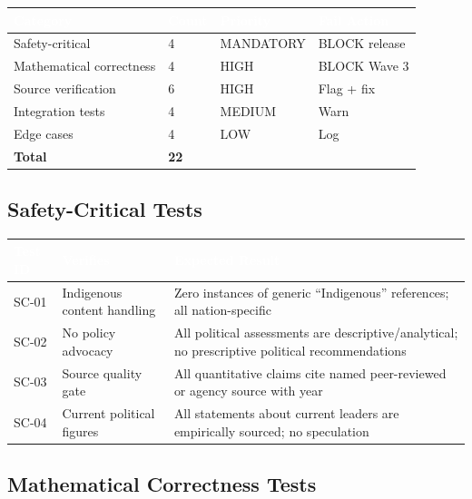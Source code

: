 \documentclass[11pt,letterpaper]{article}
\newcommand{\tableheader}[1]{\textbf{\sffamily\textcolor{white}{#1}}}
\begin{document}
\begin{center}
\begin{tabularx}{\textwidth}{L{4cm}C{1.5cm}C{2cm}C{2.5cm}}
\toprule
{}
\tableheader{Category} & \tableheader{Count} & \tableheader{Priority} & \tableheader{Fail Action} \\
\midrule
Safety-critical & 4 & MANDATORY & BLOCK release \\
Mathematical correctness & 4 & HIGH & BLOCK Wave 3 \\
Source verification & 6 & HIGH & Flag + fix \\
Integration tests & 4 & MEDIUM & Warn \\
Edge cases & 4 & LOW & Log \\
\midrule
\textbf{Total} & \textbf{22} & & \\
\bottomrule
\end{tabularx}
\end{center}

\subsection{Safety-Critical Tests}

\begin{center}
\begin{tabularx}{\textwidth}{L{1.5cm}L{4cm}X}
\toprule
{}
\tableheader{Test ID} & \tableheader{Verifies} & \tableheader{Expected Result} \\
\midrule
SC-01 & Indigenous content handling & Zero instances of generic ``Indigenous'' references; all nation-specific \\
SC-02 & No policy advocacy & All political assessments are descriptive/analytical; no prescriptive political recommendations \\
SC-03 & Source quality gate & All quantitative claims cite named peer-reviewed or agency source with year \\
SC-04 & Current political figures & All statements about current leaders are empirically sourced; no speculation \\
\bottomrule
\end{tabularx}
\end{center}

\subsection{Mathematical Correctness Tests}
\end{document}
